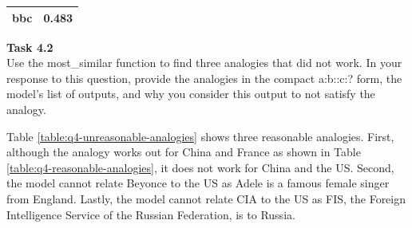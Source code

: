 \documentclass[12pt,article]{article}
\newenvironment{task}[2][Task]
    { \begin{mdframed}[backgroundcolor=gray!20] \textbf{#1 #2} \\}
    {  \end{mdframed}}
\begin{document}
\begin{table}[H]
\begin{minipage}[c]{0.25\linewidth}
{\begin{tabular}{|c|c|}
        \hline
        bbc &  0.483 \\
        \hline
\end{tabular}}
\end{minipage}
\hspace{-18pt}%
\begin{minipage}[c]{0.25\linewidth}%
\end{minipage}
\end{table}

\newpage
\begin{task}{4.2} 
Use the most\_similar function to find three analogies that did not work. In your response to this question, provide the analogies in the compact a:b::c:? form, the model's list of outputs, and why you consider this output to not satisfy the analogy.
\end{task}

Table \ref{table:q4-unreasonable-analogies} shows three reasonable analogies. First, although the analogy works out for China and France as shown in Table \ref{table:q4-reasonable-analogies}, it does not work for China and the US. Second, the model cannot relate Beyonce to the US as Adele is a famous female singer from England. Lastly, the model cannot relate CIA to the US as FIS, the Foreign Intelligence Service of the Russian Federation, is to Russia.
\end{document}
